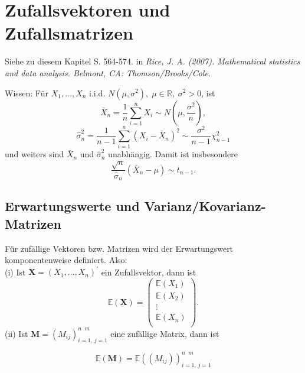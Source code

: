 \documentclass{tstextbook}
\begin{document}
\chapter{Zufallsvektoren und Zufallsmatrizen}

\begin{book}
	Siehe zu diesem Kapitel S. 564-574. in \textit{Rice, J. A. (2007). Mathematical statistics and data analysis. Belmont, CA: Thomson/Brooks/Cole.} 
\end{book}




\begin{remark}
	Wissen: Für $ X_1, \ldots ,X_n $ i.i.d. $ N(\mu,\sigma^{2}), \; \mu\in\mathbb{R}, \; \sigma^2 > 0 $, ist 
	\[ \bar{X}_n = \frac{1}{n} \sum_{i=1}^{n} X_i \sim N\left(\mu, \frac{\sigma^2}{n} \right),
	\] 
	\[ \hat{\sigma}_n^2 = \frac{1}{n-1} \sum_{i=1}^{n} ( X_i - \bar{X}_n)^2 \sim \frac{\sigma^2}{n-1} \chi_{n-1}^2 
	\]  
	und weiters sind $ \bar{X}_n $  und $ \hat{\sigma}^2_n $ unabhängig. Damit ist insbesondere 
	\[ \frac{\sqrt{n}}{\hat{\sigma}_n}(\bar{X}_n-\mu) \sim t_{n-1}.
	\]
	
\end{remark}
 
 
 


\section{Erwartungswerte und Varianz/Kovarianz-Matrizen}


\begin{definition}[Erwartungswert]
	Für zufällige Vektoren bzw. Matrizen wird der Erwartungswert komponentenweise definiert. Also: \\
	(i) Ist $ \textbf{X}= \left(X_1, \ldots ,X_n\right)^\prime $  ein Zufallsvektor, dann ist 
\[ \mathbb{E}(\textbf{X}) = \begin{pmatrix} \mathbb{E}(X_1)\\
		\mathbb{E}(X_2)\\
		\vdots\\
		\mathbb{E}(X_n)\\
	\end{pmatrix}.
\]
	(ii) Ist $ \textbf{M}=(M_{ij})_{i=1,\, j=1}^{n \;\; m} $ eine zufällige Matrix, dann ist 
	
\[ 
\mathbb{E}(\textbf{M})= \mathbb{E} \left((M_{ij})\right)_{i=1,\, j=1}^{n \;\; m}	
\]
\end{definition}
\end{document}
